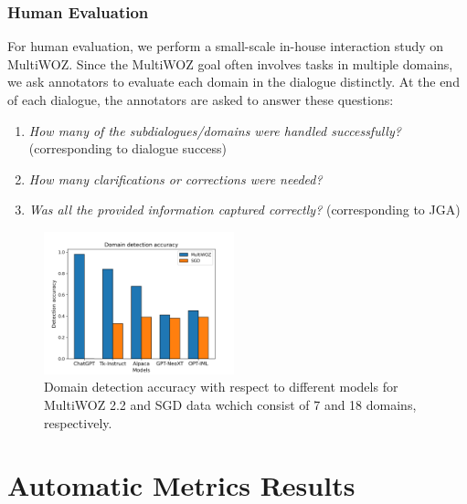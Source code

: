 \subsubsection*{Human Evaluation}
For human evaluation, we perform a small-scale in-house interaction study on MultiWOZ.
Since the MultiWOZ goal often involves tasks in multiple domains, we ask annotators to evaluate each domain in the dialogue distinctly.
At the end of each dialogue, the annotators are asked to answer these questions:
\begin{enumerate}
    \item \emph{How many of the subdialogues/domains were handled successfully?} (corresponding to dialogue success)
    \item \emph{How many clarifications or corrections were needed?}
    \item \emph{Was all the provided information captured correctly?} (corresponding to JGA)
\end{enumerate}

\begin{figure}[h]
    \centering
    \includegraphics[width=0.49\textwidth]{images/domain-detections.png}
    \caption{Domain detection accuracy with respect to different models for MultiWOZ 2.2 and SGD data wchich consist of 7 and 18 domains, respectively.}
    \label{07:fig:domains}
\end{figure}


\section{Automatic Metrics Results}
\label{07:sec:results}

